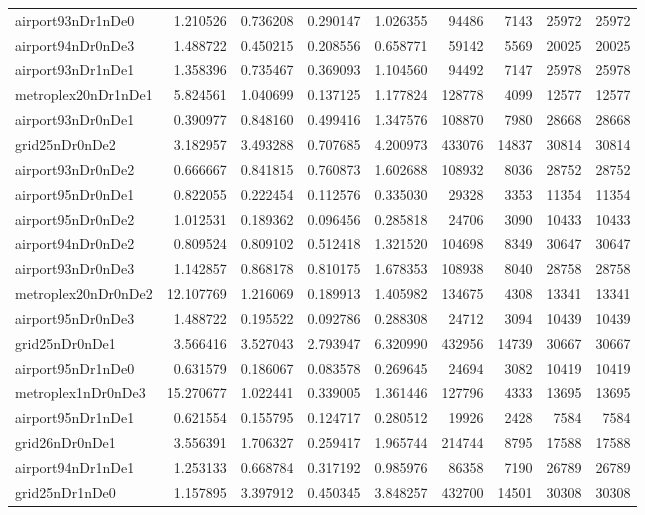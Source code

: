 \documentclass[../../../thesis.tex]{subfiles}
\begin{document}
\begin{longtable}{|l|r|r|r|r|r|r|r|r|}
airport93nDr1nDe0 & 1.210526 & 0.736208 & 0.290147 & 1.026355 & 94486 & 7143 & 25972 & 25972 \\
airport94nDr0nDe3 & 1.488722 & 0.450215 & 0.208556 & 0.658771 & 59142 & 5569 & 20025 & 20025 \\
airport93nDr1nDe1 & 1.358396 & 0.735467 & 0.369093 & 1.104560 & 94492 & 7147 & 25978 & 25978 \\
metroplex20nDr1nDe1 & 5.824561 & 1.040699 & 0.137125 & 1.177824 & 128778 & 4099 & 12577 & 12577 \\
airport93nDr0nDe1 & 0.390977 & 0.848160 & 0.499416 & 1.347576 & 108870 & 7980 & 28668 & 28668 \\
grid25nDr0nDe2 & 3.182957 & 3.493288 & 0.707685 & 4.200973 & 433076 & 14837 & 30814 & 30814 \\
airport93nDr0nDe2 & 0.666667 & 0.841815 & 0.760873 & 1.602688 & 108932 & 8036 & 28752 & 28752 \\
airport95nDr0nDe1 & 0.822055 & 0.222454 & 0.112576 & 0.335030 & 29328 & 3353 & 11354 & 11354 \\
airport95nDr0nDe2 & 1.012531 & 0.189362 & 0.096456 & 0.285818 & 24706 & 3090 & 10433 & 10433 \\
airport94nDr0nDe2 & 0.809524 & 0.809102 & 0.512418 & 1.321520 & 104698 & 8349 & 30647 & 30647 \\
airport93nDr0nDe3 & 1.142857 & 0.868178 & 0.810175 & 1.678353 & 108938 & 8040 & 28758 & 28758 \\
metroplex20nDr0nDe2 & 12.107769 & 1.216069 & 0.189913 & 1.405982 & 134675 & 4308 & 13341 & 13341 \\
airport95nDr0nDe3 & 1.488722 & 0.195522 & 0.092786 & 0.288308 & 24712 & 3094 & 10439 & 10439 \\
grid25nDr0nDe1 & 3.566416 & 3.527043 & 2.793947 & 6.320990 & 432956 & 14739 & 30667 & 30667 \\
airport95nDr1nDe0 & 0.631579 & 0.186067 & 0.083578 & 0.269645 & 24694 & 3082 & 10419 & 10419 \\
metroplex1nDr0nDe3 & 15.270677 & 1.022441 & 0.339005 & 1.361446 & 127796 & 4333 & 13695 & 13695 \\
airport95nDr1nDe1 & 0.621554 & 0.155795 & 0.124717 & 0.280512 & 19926 & 2428 & 7584 & 7584 \\
grid26nDr0nDe1 & 3.556391 & 1.706327 & 0.259417 & 1.965744 & 214744 & 8795 & 17588 & 17588 \\
airport94nDr1nDe1 & 1.253133 & 0.668784 & 0.317192 & 0.985976 & 86358 & 7190 & 26789 & 26789 \\
grid25nDr1nDe0 & 1.157895 & 3.397912 & 0.450345 & 3.848257 & 432700 & 14501 & 30308 & 30308 \\

\end{longtable}
\end{document}
